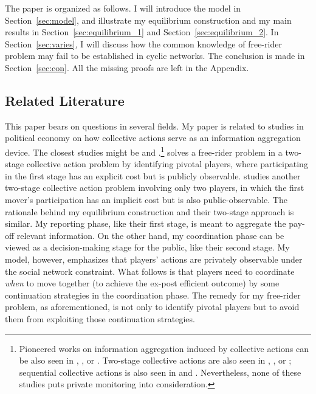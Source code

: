 \documentclass[12pt,letter]{article}
\theoremstyle{definition}
\theoremstyle{remark}
\theoremstyle{claim}
\begin{document}
The paper is organized as follows. I will introduce the model in Section~\ref{sec:model}, and illustrate my equilibrium construction and my main results in Section~\ref{sec:equilibrium_1} and Section~\ref{sec:equilibrium_2}. In Section~\ref{sec:varies}, I will discuss how the common knowledge of free-rider problem may fail to be established in cyclic networks. The conclusion is made in Section~\ref{sec:con}. All the missing proofs are left in the Appendix.



\subsection{Related Literature}

This paper bears on questions in several fields. My paper is related to studies in political economy on how collective actions serve as an information aggregation device. The closest studies might be \citep{Lohmann1994} and \citep{SHADMEHR2019}.\footnote{Pioneered works on information aggregation induced by collective actions can be also seen in \citep{Austin-smith1996}, \citep{OLSON1965}, or \citep{Feddersen1997}. Two-stage collective actions are also seen in \citep{Lohmann1993}, \citep{SHADMEHR2015}, or \citep{Battaglini2016}; sequential collective actions is also seen in \citep{Dekel2000} and \citep{Piketty2000}. Nevertheless, none of these studies puts private monitoring into consideration.} 
\citep{Lohmann1994} solves a free-rider problem in a two-stage collective action problem by identifying pivotal players, where participating in the first stage has an explicit cost but is publicly observable. \citep{SHADMEHR2019} studies another two-stage collective action problem involving only two players, in which the first mover's participation has an implicit cost but is also public-observable. The rationale behind my equilibrium construction and their two-stage approach is similar. My reporting phase, like their first stage, is meant to aggregate the pay-off relevant information. On the other hand, my coordination phase can be viewed as a decision-making stage for the public, like their second stage. My model, however, emphasizes that players' actions are privately observable under the social network constraint. What follows is that players need to coordinate \textit{when} to move together (to achieve the ex-post efficient outcome) by some continuation strategies in the coordination phase. The remedy for my free-rider problem, as aforementioned, is not only to identify pivotal players but to avoid them from exploiting those continuation strategies.      
\end{document}

